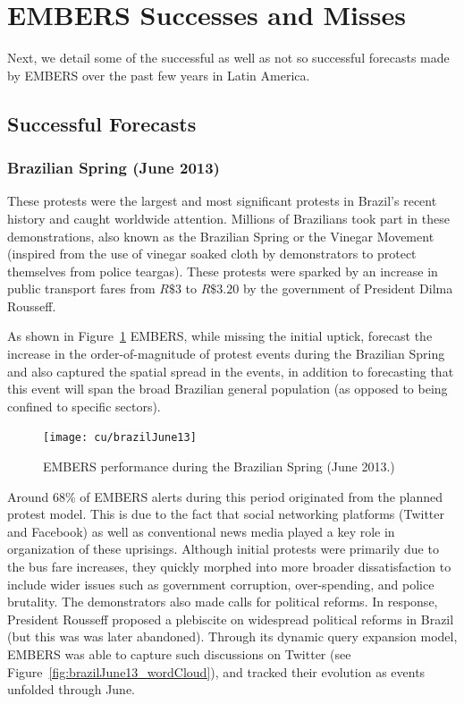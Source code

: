 \section{EMBERS Successes and Misses}
\label{sec:success}
Next, we detail
some of the successful as well as not so successful forecasts made by EMBERS over
the past few years in Latin America.
\subsection{Successful Forecasts}
\subsubsection*{Brazilian Spring (June 2013)}
These protests were the largest and most
significant protests in Brazil's recent history and caught worldwide
attention. Millions of Brazilians took part in these demonstrations,
also known as the Brazilian Spring or the Vinegar Movement (inspired
from the use of vinegar soaked cloth by demonstrators to protect
themselves from police teargas). These protests were
sparked by an increase in public transport fares from $R\$3$
to $R\$3.20$ by the government of President Dilma Rousseff.

As shown in Figure~\ref{fig:brazilJune13} EMBERS, while missing the initial uptick,
forecast the increase in the order-of-magnitude of protest events
during the Brazilian Spring and also captured
the spatial spread in the events, in addition to forecasting that this event
will span the broad Brazilian general population (as opposed to being confined to
specific sectors).

\begin{figure} %
\centering
\texttt{[image: cu/brazilJune13]}
\caption{EMBERS performance during the Brazilian Spring (June 2013.)}
\label{fig:brazilJune13}
\end{figure}

Around 68\% of EMBERS alerts during this period originated from
the planned protest model.
This is due to the fact that
social networking
platforms (Twitter and Facebook) as well as conventional news media played a key
role in organization of these uprisings. Although initial protests were
primarily due to the bus fare increases, they quickly morphed into
more broader dissatisfaction to include wider issues such as
government corruption, over-spending, and police brutality. The
demonstrators also made calls for political reforms. In response, President
Rousseff proposed a plebiscite on widespread political reforms in
Brazil (but this was was later abandoned). Through its dynamic query expansion model,
EMBERS was able to capture such discussions on Twitter
(see Figure~\ref{fig:brazilJune13_wordCloud}), and tracked their evolution as events
unfolded through June.

